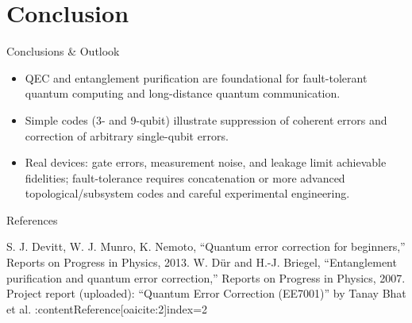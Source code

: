 \documentclass[10pt]{beamer}
\begin{document}
\section{Conclusion}
\begin{frame}{Conclusions \& Outlook}
  \begin{itemize}
    \item QEC and entanglement purification are foundational for fault-tolerant quantum computing and long-distance quantum communication.
    \item Simple codes (3- and 9-qubit) illustrate suppression of coherent errors and correction of arbitrary single-qubit errors.
    \item Real devices: gate errors, measurement noise, and leakage limit achievable fidelities; fault-tolerance requires concatenation or more advanced topological/subsystem codes and careful experimental engineering.
  \end{itemize}
\end{frame}

\begin{frame}[allowframebreaks]{References}
  \begin{thebibliography}{9}
      S. J. Devitt, W. J. Munro, K. Nemoto, ``Quantum error correction for beginners,'' Reports on Progress in Physics, 2013.
      W. D\"ur and H.-J. Briegel, ``Entanglement purification and quantum error correction,'' Reports on Progress in Physics, 2007.
      Project report (uploaded): ``Quantum Error Correction (EE7001)'' by Tanay Bhat et al. :contentReference[oaicite:2]{index=2}
  \end{thebibliography}
\end{frame}
\end{document}
